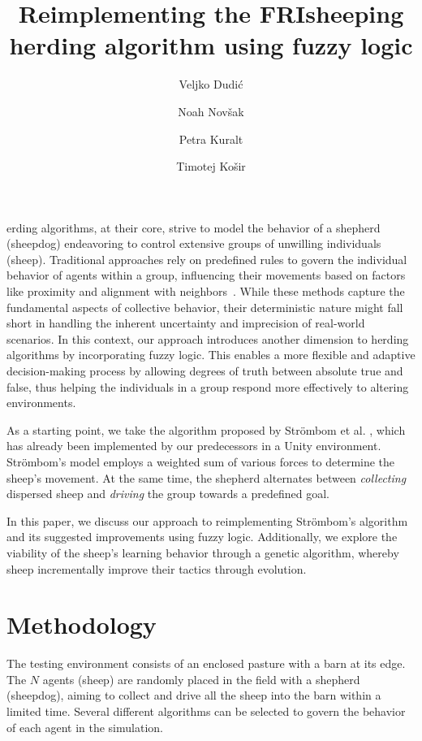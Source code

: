 \documentclass[9pt]{pnas-new}
\title{Reimplementing the FRIsheeping herding algorithm using fuzzy logic}
\author{Veljko Dudić}
\author{Noah Novšak}
\author{Petra Kuralt}
\author{Timotej Košir}
\affil{Collective behavior course research seminar report}
\begin{document}
\verticaladjustment{-2pt}

\maketitle
\thispagestyle{firststyle}

erding algorithms, at their core, strive to model the behavior of a shepherd (sheepdog) endeavoring to control extensive groups of unwilling individuals (sheep).
Traditional approaches rely on predefined rules to govern the individual behavior of agents within a group, influencing their movements based on factors like proximity and alignment with neighbors~\cite{basicHerding}. While these methods capture the fundamental aspects of collective behavior, their deterministic nature might fall short in handling the inherent uncertainty and imprecision of real-world scenarios. In this context, our approach introduces another dimension to herding algorithms by incorporating fuzzy logic. This enables a more flexible and adaptive decision-making process by allowing degrees of truth between absolute true and false, thus helping the individuals in a group respond more effectively to altering environments.


As a starting point, we take the algorithm proposed by Str\"{o}mbom et al. \cite{strombom}, which has already been implemented by our predecessors in a Unity environment. Str\"{o}mbom's model employs a weighted sum of various forces to determine the sheep's movement. At the same time, the shepherd alternates between \textit{collecting} dispersed sheep and \textit{driving} the group towards a predefined goal.

In this paper, we discuss our approach to reimplementing Str\"{o}mbom's algorithm and its suggested improvements using fuzzy logic. Additionally, we explore the viability of the sheep's learning behavior through a genetic algorithm, whereby sheep incrementally improve their tactics through evolution.

\section*{Methodology}
The testing environment consists of an enclosed pasture with a barn at its edge. The $N$ agents (sheep) are randomly placed in the field with a shepherd (sheepdog), aiming to collect and drive all the sheep into the barn within a limited time. Several different algorithms can be selected to govern the behavior of each agent in the simulation.
\end{document}
